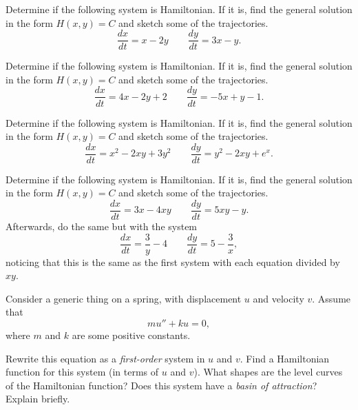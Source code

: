 \documentclass{ximera}
\begin{document}
\begin{exercise}
    Determine if the following system is Hamiltonian. If it is, find the general solution in the form $H(x,y) = C$ and sketch some of the trajectories.
    \[ 
        \frac{dx}{dt} = x - 2y \qquad \frac{dy}{dt} = 3x - y.
    \]
\end{exercise}

\begin{exercise}
    Determine if the following system is Hamiltonian. If it is, find the general solution in the form $H(x,y) = C$ and sketch some of the trajectories.
    \[ 
        \frac{dx}{dt} = 4x - 2y + 2 \qquad \frac{dy}{dt} = -5x + y - 1.
    \]
\end{exercise}


\begin{exercise}
    Determine if the following system is Hamiltonian. If it is, find the general solution in the form $H(x,y) = C$ and sketch some of the trajectories.
    \[ 
        \frac{dx}{dt} = x^2 - 2xy + 3y^2 \qquad \frac{dy}{dt} = y^2 - 2xy + e^x .
    \]
\end{exercise}


\begin{exercise}
    Determine if the following system is Hamiltonian. If it is, find the general solution in the form $H(x,y) = C$ and sketch some of the trajectories.
    \[ 
        \frac{dx}{dt} = 3x - 4xy \qquad \frac{dy}{dt} = 5xy - y.
    \]
    Afterwards, do the same but with the system 
    \[ 
        \frac{dx}{dt} = \frac{3}{y} - 4 \qquad \frac{dy}{dt} = 5 - \frac{3}{x}, 
    \] 
    noticing that this is the same as the first system with each equation divided by $xy$.
\end{exercise}

\begin{exercise} 
    Consider a generic thing on a spring, with displacement $u$ and velocity $v$. Assume that $$mu''+ku=0,$$ where $m$ and $k$ are some positive constants.
    \begin{tasks}
        \task Rewrite this equation as a {\it first-order} system in $u$ and $v$.
        \task Find a Hamiltonian function for this system (in terms of $u$ and $v$).
        \task What shapes are the level curves of the Hamiltonian function? 
        \task Does this system have a {\it basin of attraction}? Explain briefly. 
    \end{tasks}
\end{exercise}
\end{document}
